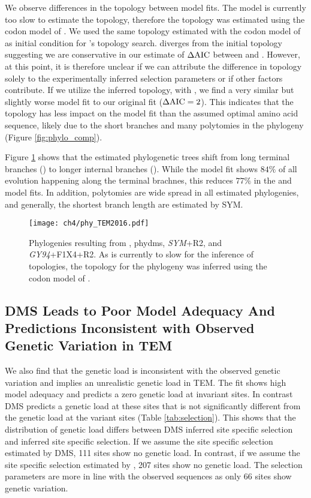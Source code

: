 We observe differences in the topology between model fits.
The \selac model is currently too slow to estimate the topology, therefore the topology was estimated using the codon model of \citet{KosiolEtAl07}.
We used the same topology estimated with the codon model of \citet{KosiolEtAl07} as initial condition for \phydms's topology search.
\phydms diverges from the initial topology suggesting we are conservative in our estimate of $\Delta\text{AIC}$ between \selac and \phydms.
However, at this point, it is therefore unclear if  we can attribute the difference in topology solely to the experimentally inferred selection parameters or if other factors contribute.
If we utilize the \phydms inferred topology, with \selac, we find a very similar but slightly worse model fit to our original \selac fit ($\Delta\text{AIC} = 2$).
This indicates that the topology has less impact on the model fit than the assumed optimal amino acid sequence, likely due to the short branches and many polytomies in the phylogeny (Figure \ref{fig:phylo_comp}).

Figure \ref{fig:phylo} shows that the estimated phylogenetic trees shift from long terminal branches (\selac) to longer internal branches (\phydms).
While the \selac model fit shows $84 \%$ of all evolution happening along the terminal brachnes, this reduces $77 \%$ in the \phydms and \gy model fits.
In addition, polytomies are wide spread in all estimated phylogenies, and generally, the shortest branch length are estimated by SYM.


\singlespacing
\begin{figure}[H]
     \centering
	\texttt{[image: ch4/phy\_TEM2016.pdf]}
	\caption{Phylogenies resulting from \selac, phydms, \emph{SYM}+R2, and \emph{GY94}+F1X4+R2. As \selac is currently to slow for the inference of topologies, the topology for the \selac phylogeny was inferred using the codon model of \citet{KosiolEtAl07}.}
	\label{fig:phylo}
\end{figure}
\doublespacing
\clearpage

\subsection{DMS Leads to Poor Model Adequacy And Predictions Inconsistent with Observed Genetic Variation in TEM}

We also find that the genetic load is inconsistent with the observed genetic variation and implies an unrealistic genetic load in TEM.
The \selac fit shows high model adequacy and predicts a zero genetic load at invariant sites.
In contrast DMS predicts a genetic load at these sites that is not significantly different from the genetic load at the variant sites (Table \ref{tab:selection}).
This shows that the distribution of genetic load differs between DMS inferred site specific selection and \selac inferred site specific selection.
If we assume the site specific selection estimated by DMS, 111 sites show no genetic load.
In contrast, if we assume the site specific selection estimated by \selac, 207 sites show no genetic load.
The \selac selection parameters are more in line with the observed sequences as only 66 sites show genetic variation.


